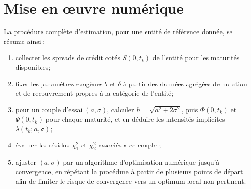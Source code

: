 \section{Mise en \oe uvre numérique}

La procédure complète d'estimation, pour une entité de référence donnée, se résume ainsi :

\begin{enumerate}
	\item collecter les spreads de crédit cotés $S(0,t_k)$ de l'entité pour les maturités disponibles;
	\item fixer les paramètres exogènes $b$ et $\delta$ à partir des données agrégées de notation et de recouvrement propres à la catégorie de l'entité;
	\item pour un couple d'essai $(a,\sigma)$, calculer $h=\sqrt{a^2+2\sigma^2}$, puis $\Phi(0,t_k)$ et $\Psi(0,t_k)$ pour chaque maturité, et en déduire les intensités implicites $\lambda(t_k;a,\sigma)$;
	\item évaluer les résidus $\chi_1^2$ et $\chi_2^2$ associés à ce couple ;
	\item ajuster $(a,\sigma)$ par un algorithme d'optimisation numérique jusqu'à convergence, en répétant la procédure à partir de plusieurs points de départ afin de limiter le risque de convergence vers un optimum local non pertinent.
\end{enumerate}

